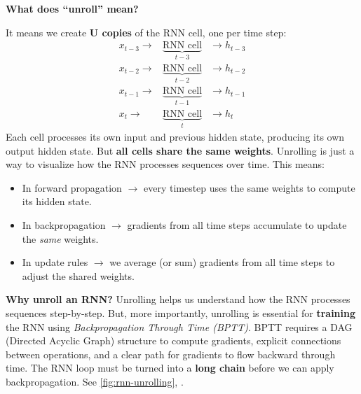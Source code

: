 \begin{flushleft}
    \textcolor{Green3}{ \textbf{What does ``unroll'' mean?}}
\end{flushleft}
It means we create \textbf{U copies} of the RNN cell, one per time step:
\begin{equation*}
    \begin{array}{rcl}
        x_{t-3} \rightarrow & \underbrace{\text{RNN cell}}_{t-3} & \rightarrow h_{t-3} \\[1.4em]
        x_{t-2} \rightarrow & \underbrace{\text{RNN cell}}_{t-2} & \rightarrow h_{t-2} \\[1.4em]
        x_{t-1} \rightarrow & \underbrace{\text{RNN cell}}_{t-1} & \rightarrow h_{t-1} \\[1.4em]
        x_{t}   \rightarrow & \underbrace{\text{RNN cell}}_{t}   & \rightarrow h_{t}
    \end{array}
\end{equation*}
Each cell processes its own input and previous hidden state, producing its own output hidden state. But \textbf{all cells share the same weights}. Unrolling is just a way to visualize how the RNN processes sequences over time. This means:
\begin{itemize}
    \item In forward propagation $\to$ every timestep uses the same weights to compute its hidden state.
    \item In backpropagation $\to$ gradients from all time steps accumulate to update the \emph{same} weights.
    \item In update rules $\to$ we average (or sum) gradients from all time steps to adjust the shared weights.
\end{itemize}
\textcolor{Green3}{ \textbf{Why unroll an RNN?}} Unrolling helps us understand how the RNN processes sequences step-by-step. But, more importantly, unrolling is essential for \textbf{training} the RNN using \emph{Backpropagation Through Time (BPTT)}. BPTT requires a DAG (Directed Acyclic Graph) structure to compute gradients, explicit connections between operations, and a clear path for gradients to flow backward through time. The RNN loop must be turned into a \textbf{long chain} before we can apply backpropagation. See \autoref{fig:rnn-unrolling}, .

